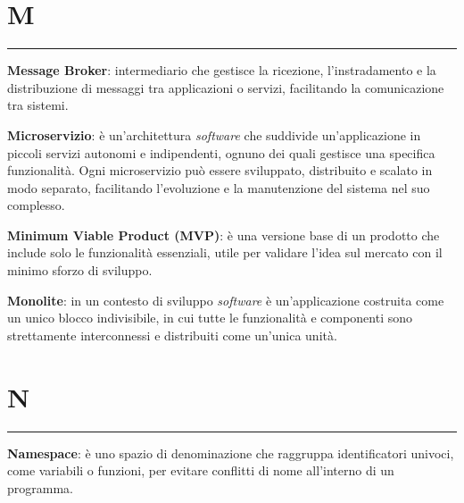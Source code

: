 \section*{M}
{\color{lightgray}\rule{\textwidth}{0.4pt}} %
\begin{glossaryitemize}
    \item \textbf{Message Broker}: intermediario che gestisce la ricezione, l'instradamento e la distribuzione di messaggi tra applicazioni o servizi, facilitando la comunicazione tra sistemi.
    \item \textbf{Microservizio}: è un'architettura \textit{software} che suddivide un'applicazione in piccoli servizi autonomi e indipendenti, ognuno dei quali gestisce una specifica funzionalità. Ogni microservizio può essere sviluppato, distribuito e scalato in modo separato, facilitando l'evoluzione e la manutenzione del sistema nel suo complesso.
    \item \textbf{Minimum Viable Product (MVP)}: è una versione base di un prodotto che include solo le funzionalità essenziali, utile per validare l'idea sul mercato con il minimo sforzo di sviluppo.
    \item \textbf{Monolite}: in un contesto di sviluppo \textit{software} è un'applicazione costruita come un unico blocco indivisibile, in cui tutte le funzionalità e componenti sono strettamente interconnessi e distribuiti come un'unica unità.
\end{glossaryitemize}

\section*{N}
{\color{lightgray}\rule{\textwidth}{0.4pt}} %
\begin{glossaryitemize}
    \item \textbf{Namespace}: è uno spazio di denominazione che raggruppa identificatori univoci, come variabili o funzioni, per evitare conflitti di nome all’interno di un programma.
\end{glossaryitemize}


